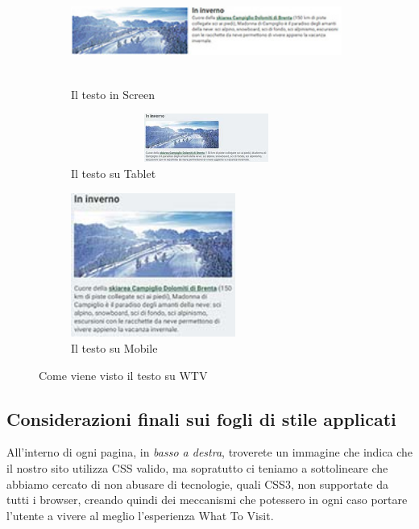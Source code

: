 \begin{figure}[h!]
        \centering
        \begin{subfigure}[b]{0.3\textwidth}
                \includegraphics[height=3.47cm,width=8.9cm]{images/pres_descr.jpg}
                \caption{Il testo in Screen}
                \label{fig:Descr-screen}
        \end{subfigure}
        \hspace{5cm}
        \begin{subfigure}[b]{0.3\textwidth}
                \includegraphics[height=1.59cm,width=8.9cm]{images/pres_descr_t.jpg}
                \caption{Il testo su Tablet}
                \label{fig:Descr-tablet}
        \end{subfigure}
        \begin{subfigure}[b]{0.3\textwidth}
                \centering
                \includegraphics[height=4.73cm,width=5.4cm]{images/pres_descr_m.jpg}
                \caption{Il testo su Mobile}
                \label{fig:Descr-mobile}
        \end{subfigure}
        \caption{Come viene visto il testo su WTV}\label{fig:Display-Descrloc}
\end{figure}

\subsection{Considerazioni finali sui fogli di stile applicati}\label{sec:Pres-CSSValid}
All'interno di ogni pagina, in \textit{basso a destra}, troverete un immagine
che indica che il nostro sito utilizza CSS valido, ma sopratutto ci teniamo a
sottolineare che abbiamo cercato di non abusare di tecnologie, quali CSS3, non
supportate da tutti i browser, creando quindi dei meccanismi che potessero in
ogni caso portare l'utente a vivere al meglio l'esperienza What To Visit.

